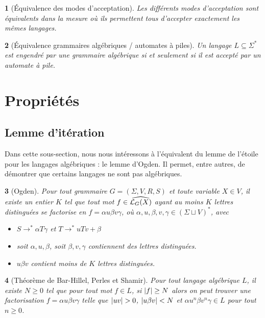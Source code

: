 \documentclass[11pt,a4paper]{article}
\theoremstyle{plain}
\newtheorem{thm}{\protect\theoremname}
\theoremstyle{definition}
\theoremstyle{definition}
\theoremstyle{remark}
\theoremstyle{remark}
\theoremstyle{plain}
\newtheorem{lem}[thm]{\protect\lemmaname}
\theoremstyle{plain}
\newtheorem{prop}[thm]{\protect\propositionname}
\theoremstyle{plain}
\newtheorem{cor}[thm]{\protect\corollaryname}
\theoremstyle{remark}
\providecommand{\corollaryname}{Corollaire}
\providecommand{\lemmaname}{Lemme}
\providecommand{\propositionname}{Proposition}
\providecommand{\theoremname}{Théorème}
\begin{document}
\begin{prop}[Équivalence des modes d'acceptation]
	Les différents modes d'acceptation sont équivalents dans la mesure où ils permettent tous d'accepter exactement les mêmes langages.	
\end{prop}

\begin{thm}[Équivalence grammaires algébriques / automates à piles]\label{th:equiv}
	Un langage $L\subseteq\Sigma^*$ est engendré par une grammaire algébrique si et seulement si il est accepté par un automate à pile.	
\end{thm}

\section{Propriétés}

\subsection{Lemme d'itération} %

Dans cette sous-section, nous nous intéressons à l'équivalent du lemme de l'étoile pour les langages algébriques : le lemme d'Ogden. Il permet, entre autres, de démontrer que certains langages ne sont pas algébriques.

\begin{lem}[Ogden]\label{th:ogden}
	Pour tout grammaire $G=(\Sigma,V,R,S)$ et toute variable $X\in V$, il existe un entier $K$ tel que tout mot $f\in \widehat{\mathcal{L}_G(X)}$ ayant au moins $K$ lettres distinguées se factorise en $f=\alpha u \beta v \gamma$, où $\alpha,u,\beta,v,\gamma\in (\Sigma\sqcup V)^*$, avec
	\begin{itemize}
		\item $S\to^*\alpha T \gamma$ et $T\to ^*uTv+\beta$
		\item soit $\alpha, u, \beta$, soit $\beta, v, \gamma$ contiennent des lettres distinguées.
		\item $u\beta v$ contient moins de $K$ lettres distinguées.
	\end{itemize}
\end{lem}

\begin{cor}[Théorème de Bar-Hillel, Perles et Shamir]\label{th:bhs}
	Pour tout langage algébrique $L$, il existe $N\ge 0$ tel que pour tout mot $f\in L$, si $\left|f\right|\ge N$ alors on peut trouver une factorisation $f=\alpha u \beta v \gamma$ telle que $\abs{uv}>0$, $\left|u\beta v\right|<N$ et $\alpha u^n \beta v^n \gamma\in L$ pour tout $n\ge 0$.	
\end{cor}
\end{document}
